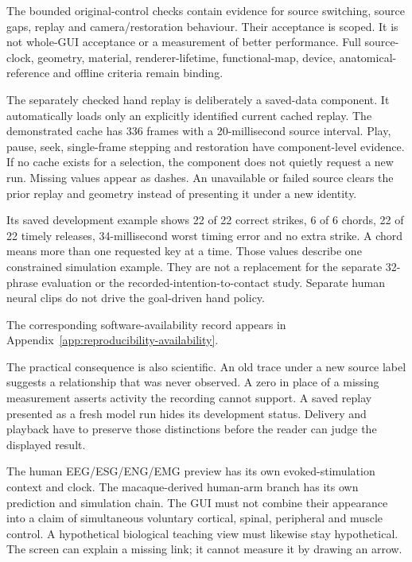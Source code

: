 The bounded original-control checks contain evidence for source switching,
source gaps, replay and camera/restoration behaviour. Their acceptance is scoped.
It is not whole-GUI acceptance or a measurement of better performance. Full
source-clock, geometry, material, renderer-lifetime, functional-map, device,
anatomical-reference and offline criteria remain binding.

The separately checked hand replay is deliberately a saved-data component.
It automatically loads only an explicitly identified current cached replay.
The demonstrated cache has 336 frames with a 20-millisecond source interval.
Play, pause, seek, single-frame stepping and restoration have component-level
evidence. If no cache exists for a selection, the component does not quietly
request a new run. Missing values appear as dashes. An unavailable or failed
source clears the prior replay and geometry instead of presenting it under a
new identity.

Its saved development example shows 22 of 22 correct strikes, 6 of 6 chords,
22 of 22 timely releases, 34-millisecond worst timing error and no extra strike.
A chord means more than one requested key at a time. Those values describe
one constrained simulation example. They are not a replacement for the separate
32-phrase evaluation or the recorded-intention-to-contact study. Separate human
neural clips do not drive the goal-driven hand policy.

The corresponding software-availability record appears in Appendix~\ref{app:reproducibility-availability}.





The practical consequence is also scientific. An old trace under a new source
label suggests a relationship that was never observed. A zero in place of a
missing measurement asserts activity the recording cannot support. A saved
replay presented as a fresh model run hides its development status. Delivery
and playback have to preserve those distinctions before the reader can judge
the displayed result.

The human EEG/ESG/ENG/EMG preview has its own evoked-stimulation context and clock.
The macaque-derived human-arm branch has its own prediction and simulation
chain. The GUI must not combine their appearance into a claim of simultaneous
voluntary cortical, spinal, peripheral and muscle control. A hypothetical
biological teaching view must likewise stay hypothetical. The screen can
explain a missing link; it cannot measure it by drawing an arrow.


